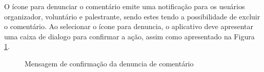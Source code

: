 O ícone para denunciar o comentário emite uma notificação para os usuários organizador, voluntário e palestrante, sendo estes tendo a possibilidade de excluir o comentário. Ao selecionar o ícone para denuncia, o aplicativo deve apresentar uma caixa de dialogo para confirmar a ação, assim como apresentado na Figura \ref{fig:audiencia11}.

\begin{figure}[H]
    \centering
    \caption{Mensagem de confirmação da denuncia de comentário}
    \label{fig:audiencia11}
\end{figure}

